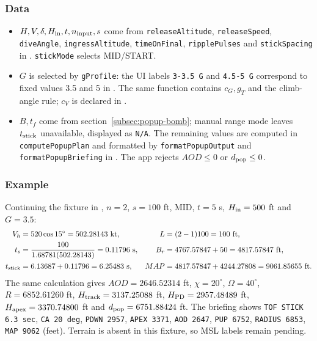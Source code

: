 \documentclass[10pt,a4paper]{amsart}
\begin{document}
\subsubsection*{Data}
\begin{itemize}
\setlength{\itemsep}{0pt}
\setlength{\parsep}{0pt}
\item $H,V,\delta,H_{\rm in},t,n_{\rm input},s$ come from
\texttt{releaseAltitude}, \texttt{releaseSpeed}, \texttt{diveAngle},
\texttt{ingressAltitude}, \texttt{timeOnFinal}, \texttt{ripplePulses}
and \texttt{stickSpacing} in .
\texttt{stickMode} selects MID/START.
\item $G$ is selected by \texttt{gProfile}: the UI labels
\texttt{3-3.5 G} and \texttt{4.5-5 G} correspond to fixed values
3.5 and 5 in .
The same function contains $c_G,g_T$ and the climb-angle rule;
$c_V$ is declared in .
\item $B,t_f$ come from section~\ref{subsec:popup-bomb};
manual range mode leaves $t_{\rm stick}$ unavailable, displayed
as \texttt{N/A}. The remaining values are computed in
\texttt{computePopupPlan} and formatted by \texttt{formatPopupOutput}
and \texttt{formatPopupBriefing} in .
The app rejects $AOD\leq0$ or $d_{\rm pop}\leq0$.
\end{itemize}

\subsubsection*{Example}
Continuing the fixture in ,
$n=2$, $s=100$ ft, MID, $t=5$ s, $H_{\rm in}=500$ ft and $G=3.5$:
\begin{align*}
 V_h&=520\cos15^\circ=502.28143\ {\rm kt},&
 L&=(2-1)100=100\ {\rm ft},\\
 t_s&=\frac{100}{1.68781(502.28143)}=0.11796\ {\rm s},&
 B_r&=4767.57847+50=4817.57847\ {\rm ft},\\
 t_{\rm stick}&=6.13687+0.11796=6.25483\ {\rm s},&
 MAP&=4817.57847+4244.27808=9061.85655\ {\rm ft}.
\end{align*}
The same calculation gives $AOD=2646.52314$ ft,
$\chi=20^\circ$, $\Omega=40^\circ$, $R=6852.61260$ ft,
$H_{\rm track}=3137.25088$ ft, $H_{\rm PD}=2957.48489$ ft,
$H_{\rm apex}=3370.74800$ ft and $d_{\rm pop}=6751.88424$ ft.
The briefing shows \texttt{TOF STICK 6.3 sec}, \texttt{CA 20 deg},
\texttt{PDWN 2957}, \texttt{APEX 3371}, \texttt{AOD 2647},
\texttt{PUP 6752}, \texttt{RADIUS 6853}, \texttt{MAP 9062} (feet).
Terrain is absent in this fixture, so MSL labels remain pending.
\end{document}
